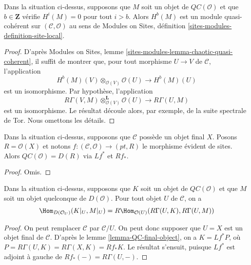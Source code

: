 \begin{lemma}
\label{lemma-QC-bounded-above}
Dans la situation ci-dessus, supposons que $M$ soit un objet de
$\mathit{QC}(\mathcal{O})$ et que $b \in \mathbf{Z}$ vérifie $H^i(M) = 0$ pour
tout $i > b$. Alors $H^b(M)$ est un module quasi-cohérent sur
$(\mathcal{C}, \mathcal{O})$ au sens de Modules on Sites, définition
\ref{sites-modules-definition-site-local}.
\end{lemma}

\begin{proof}
D'après Modules on Sites, lemme
\ref{sites-modules-lemma-chaotic-quasi-coherent}, il suffit de montrer que,
pour tout morphisme $U \to V$ de $\mathcal{C}$, l'application
$$
H^b(M)(V) \otimes_{\mathcal{O}(V)} \mathcal{O}(U) \to H^b(M)(U)
$$
est un isomorphisme. Par hypothèse, l'application
$$
R\Gamma(V, M) \otimes_{\mathcal{O}(V)}^\mathbf{L} \mathcal{O}(U)
\to R\Gamma(U, M)
$$
est un isomorphisme. Le résultat découle alors, par exemple, de la suite
spectrale de Tor. Nous omettons les détails.
\end{proof}

\begin{lemma}
\label{lemma-QC-final-object}
Dans la situation ci-dessus, supposons que $\mathcal{C}$ possède un objet
final $X$. Posons $R = \mathcal{O}(X)$ et notons
$f : (\mathcal{C}, \mathcal{O}) \to (pt, R)$ le morphisme évident de sites.
Alors $\mathit{QC}(\mathcal{O}) = D(R)$ via $Lf^*$ et $Rf_*$.
\end{lemma}

\begin{proof}
Omis.
\end{proof}

\begin{lemma}
\label{lemma-QC-hom-out-of}
Dans la situation ci-dessus, supposons que $K$ soit un objet de
$\mathit{QC}(\mathcal{O})$ et que $M$ soit un objet quelconque de
$D(\mathcal{O})$. Pour tout objet $U$ de $\mathcal{C}$, on a
$$
\Hom_{D(\mathcal{O}_U)}(K|_U, M|_U) =
R\Hom_{\mathcal{O}(U)}(R\Gamma(U, K), R\Gamma(U, M))
$$
\end{lemma}

\begin{proof}
On peut remplacer $\mathcal{C}$ par $\mathcal{C}/U$. On peut donc supposer
que $U = X$ est un objet final de $\mathcal{C}$. D'après le lemme
\ref{lemma-QC-final-object}, on a $K = Lf^*P$, où
$P = R\Gamma(U, K) = R\Gamma(X, K) = Rf_*K$. Le résultat s'ensuit, puisque
$Lf^*$ est adjoint à gauche de $Rf_*(-) = R\Gamma(U, -)$.
\end{proof}

